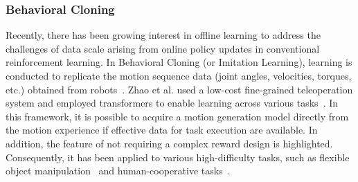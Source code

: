 \subsubsection{Behavioral Cloning}

Recently, there has been growing interest in offline learning to address the challenges of data scale arising from online policy updates in conventional reinforcement learning. In Behavioral Cloning (or Imitation Learning), learning is conducted to replicate the motion sequence data (joint angles, velocities, torques, etc.) obtained from robots~\cite{yu2018one,Zhao2023rss,jang2021bc,Lynch2022,guhur2023instruction,chi2023diffusionpolicy}. Zhao et al. used a low-cost fine-grained teleoperation system and employed transformers to enable learning across various tasks~\cite{Zhao2023rss,fu2024mobile}. In this framework, it is possible to acquire a motion generation model directly from the motion experience if effective data for task execution are available. In addition, the feature of not requiring a complex reward design is highlighted. Consequently, it has been applied to various high-difficulty tasks, such as flexible object manipulation~\cite{Kawaharazuka2019icra} and human-cooperative tasks~\cite{Sasagawa2020ral}. 


